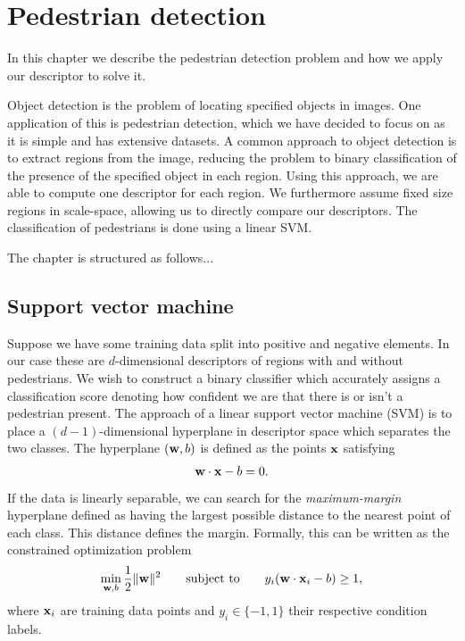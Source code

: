 \documentclass[thesis.tex]{subfiles}
\begin{document}
\chapter{Pedestrian detection}
\label{sec:od}
In this chapter we describe the pedestrian detection problem and how we apply our descriptor to solve it.

Object detection is the problem of locating specified objects in images. One application of this is pedestrian detection, which we have decided to focus on as it is simple and has extensive datasets. A common approach to object detection is to extract regions from the image, reducing the problem to binary classification of the presence of the specified object in each region. Using this approach, we are able to compute one descriptor for each region. We furthermore assume fixed size regions in scale-space, allowing us to directly compare our descriptors. The classification of pedestrians is done using a linear SVM.

The chapter is structured as follows...

\section{Support vector machine}

Suppose we have some training data split into positive and negative elements. In our case these are $d$-dimensional descriptors of regions with and without pedestrians. We wish to construct a binary classifier which accurately assigns a classification score denoting how confident we are that there is or isn't a pedestrian present. The approach of a linear support vector machine (SVM) is to place a $(d-1)$-dimensional hyperplane in descriptor space which separates the two classes. The hyperplane $(\mathbf{w},b)$ is defined as the points $\mathbf{x}$ satisfying
%
\begin{align*}
\mathbf{w} \cdot \mathbf{x} - b = 0.
\end{align*}
%
If the data is linearly separable, we can search for the \emph{maximum-margin} hyperplane defined as having the largest possible distance to the nearest point of each class. This distance defines the margin. Formally, this can be written as the constrained optimization problem
%
\begin{align*}
\min_{\mathbf{w},b} \frac12 \| \mathbf{w} \|^2 \qquad \text{subject to} \qquad y_i (\mathbf{w} \cdot \mathbf{x}_i - b) \geq 1,
\end{align*}
%
where $\mathbf{x}_i$ are training data points and $y_i \in \{-1,1\}$ their respective condition labels.
\end{document}
